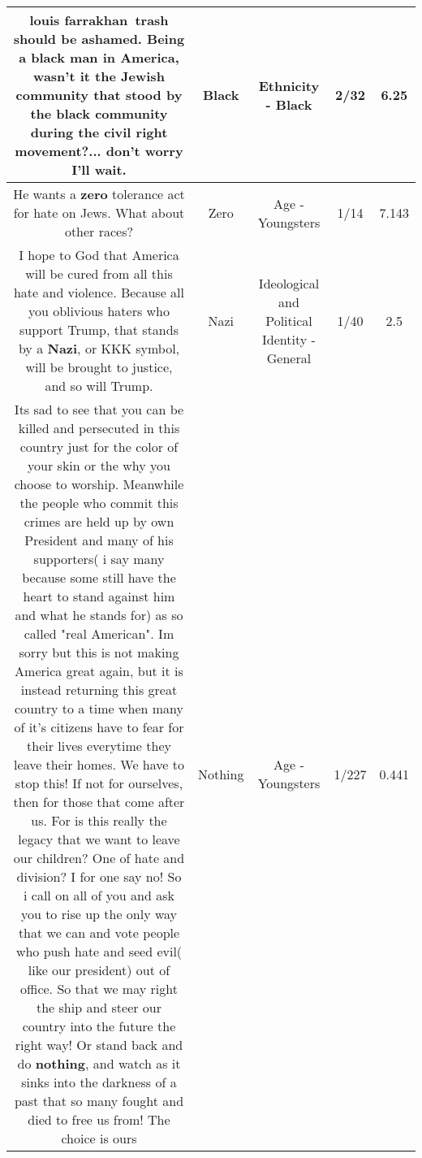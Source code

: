 \documentclass[11pt]{article}
\newlength\mylength
\begin{document}
\begin{center}
\begin{longtable}{|C{.65\mylength}|C{.30\mylength}|C{.12\mylength}|C{.12\mylength}|C{.12\mylength}|}
  \small louis farrakhan trash should be ashamed. Being a \textbf{black} man in America, wasn't it the Jewish community that stood by the \textbf{black} community during the civil right movement?... don't worry I'll wait.\normalsize   & Black & Ethnicity - Black & 2/32 & 6.25 \\  \hline
  \small He wants a \textbf{zero} tolerance act for hate on Jews. What about other races?\normalsize   & Zero & Age - Youngsters & 1/14 & 7.143 \\  \hline
  \small I hope to God that America will be cured from all this hate and violence. Because all you oblivious haters who support Trump, that stands by a \textbf{Nazi}, or KKK symbol, will be brought to justice, and so will Trump.\normalsize   & Nazi &  Ideological and Political Identity - General & 1/40 & 2.5 \\  \hline
  \small Its sad to see that you can be killed and persecuted in this country just for the color of your skin or the why you choose to worship. Meanwhile the people who commit this crimes are held up by own President and many of his supporters( i say many because some still have the heart to stand against him and what he stands for) as so called "real American". Im sorry but this is not making America great again, but it is instead returning this great country to a time when many of it's citizens have to fear for their lives everytime they leave their homes. We have to stop this! If not for ourselves, then for those that come after us. For is this really the legacy that we want to leave our children? One of hate and division? I for one say no! So i call on all of you and ask you to rise up the only way that we can and vote people who push hate and seed evil( like our president) out of office. So that we may right the ship and steer our country into the future the right way! Or stand back and do \textbf{nothing}, and watch as it sinks into the darkness of a past that so many fought and died to free us from! The choice is ours\normalsize   & Nothing & Age - Youngsters & 1/227 & 0.441 \\  \hline

\end{longtable}
\end{center}
\end{document}
